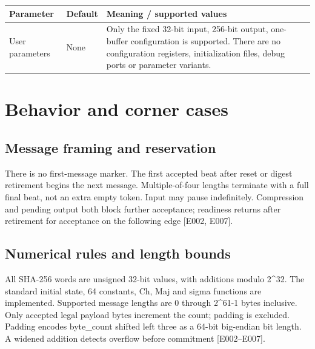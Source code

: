 \documentclass[11pt,a4paper]{article}
\begin{document}
{\small\renewcommand{\arraystretch}{1.18}\begin{longtable}{@{}L{0.22\textwidth}|L{0.21\textwidth}|L{0.49\textwidth}@{}}\toprule

\textbf{Parameter} & \textbf{Default} & \textbf{Meaning /\allowbreak{} supported values}\\\midrule\endhead

User parameters & None & Only the fixed 32-bit input,\allowbreak{} 256-bit output,\allowbreak{} one-buffer configuration is supported. There are no configuration registers,\allowbreak{} initialization files,\allowbreak{} debug ports or parameter variants.\\[2pt]\hline

\bottomrule\end{longtable}}

\section{Behavior and corner cases}

\subsection{Message framing and reservation}

There is no first-message marker. The first accepted beat after reset or digest retirement begins the next message. Multiple-of-four lengths terminate with a full final beat,\allowbreak{} not an extra empty token. Input may pause indefinitely. Compression and pending output both block further acceptance; readiness returns after retirement for acceptance on the following edge [\allowbreak{}E002,\allowbreak{} E007]\allowbreak{}.

\subsection{Numerical rules and length bounds}

All SHA-256 words are unsigned 32-bit values,\allowbreak{} with additions modulo 2\textasciicircum{}32. The standard initial state,\allowbreak{} 64 constants,\allowbreak{} Ch,\allowbreak{} Maj and sigma functions are implemented. Supported message lengths are 0 through 2\textasciicircum{}61-1 bytes inclusive. Only accepted legal payload bytes increment the count; padding is excluded. Padding encodes byte\_\allowbreak{}count shifted left three as a 64-bit big-endian bit length. A widened addition detects overflow before commitment [\allowbreak{}E002–E007]\allowbreak{}.
\end{document}
